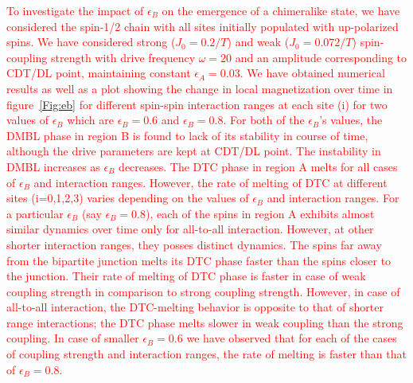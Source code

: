 \documentclass[12pt]{iopart}
\newcommand{\red}[1]{\textcolor{red}{#1}}
\begin{document}
\red{To investigate the impact of $\epsilon_B$ on the emergence of a chimeralike state, we have considered the spin-1/2 chain with all sites initially populated with up-polarized spins. We have considered strong ($J_0 = 0.2/T$) and weak ($J_0 = 0.072/T$) spin-coupling strength with drive frequency $\omega = 20$ and an amplitude corresponding to CDT/DL point, maintaining constant $\epsilon_A=0.03$. We have obtained numerical results as well as a plot showing the change in local magnetization over time in figure~\ref{Fig:eb} for different spin-spin interaction ranges at each site (i) for two values of $\epsilon_B$ which are $\epsilon_B = 0.6$ and $\epsilon_B = 0.8$. For both of the $\epsilon_B$'s values, the DMBL phase in region B is found to lack of its stability in course of time, although the drive parameters are kept at CDT/DL point. The instability in DMBL increases as $\epsilon_B$ decreases. The DTC phase in region A melts for all cases of $\epsilon_B$ and interaction ranges. However, the rate of melting of DTC at different sites (i=0,1,2,3) varies depending on the values of $\epsilon_B$ and interaction ranges. For a particular $\epsilon_B$ (say $\epsilon_B=0.8$), each of the spins in region A exhibits almost similar dynamics over time only for all-to-all interaction. However, at other shorter interaction ranges, they posses distinct dynamics. The spins far away from the bipartite junction melts its DTC phase faster than the spins closer to the junction. Their rate of melting of DTC phase is faster in case of weak coupling strength in comparison to strong coupling strength. However, in case of all-to-all interaction, the DTC-melting behavior is opposite to that of shorter range interactions; the DTC phase melts slower in weak coupling than the strong coupling. In case of smaller $\epsilon_B=0.6$ we have observed that for each of the cases of coupling strength and interaction ranges, the rate of melting is faster than that of $\epsilon_B=0.8$.}
\end{document}
